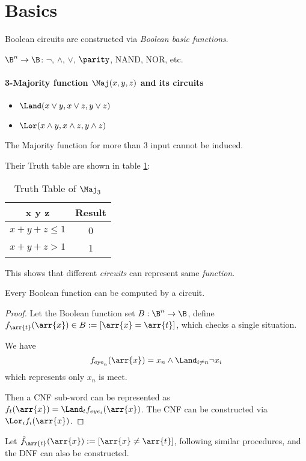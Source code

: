 \section{Basics}

Boolean circuits are constructed via \emph{Boolean basic functions}.

$\B^n \rightarrow \B$: $\lnot$, $\land$, $\lor$, $\parity$, NAND, NOR, etc.

\paragraph{3-Majority function $\Maj(x,y,z)$ and its circuits}

\begin{itemize}
\item \(\Land(x\lor y, x\lor z, y\lor z)\)
\item \(\Lor(x\land y, x\land z, y\land z)\)
\end{itemize}

\begin{remark}
The Majority function for more than 3 input cannot be induced.
\end{remark}

Their Truth table are shown in table \ref{tab:truth-table-of-major-function}:

\begin{table}[ht]
    \centering
    \begin{tabular}{c|c}
    \hline
         x y z & Result \\\hline
        \(x+y+z \le 1\) & 0 \\\hline
        \(x+y+z > 1\) & 1 \\\hline
    \end{tabular}
    \caption{Truth Table of $\Maj_3$}
    \label{tab:truth-table-of-major-function}
\end{table}

This shows that different \emph{circuits} can represent same \emph{function}.

\begin{theorem}\label{th:boolean-circuit-soundness}
Every Boolean function can be computed by a circuit.
\end{theorem}

\begin{proof}
Let the Boolean function set \(B: \B^n \rightarrow \B\), define \(f_{\arr{t}}(\arr{x}) \in B := [ \arr{x} = \arr{t} ]\), which checks a single situation.

We have 
$$f_{\text{eye}_n}(\arr{x}) = x_n \land \Land_{i \neq n} \neg {x_i}$$
which represents only $x_n$ is meet.

Then a CNF sub-word can be represented as $f_t(\arr{x}) = \Land_t f_{eye_i}(\arr{x})$. The CNF can be constructed via $\Lor_i f_i(\arr{x})$.
\end{proof}

\begin{remark}
Let $\hat{f}_{\arr{t}}(\arr{x}) := [\arr{x} \neq \arr{t}]$, following similar procedures, and the DNF can also be constructed.
\end{remark}
